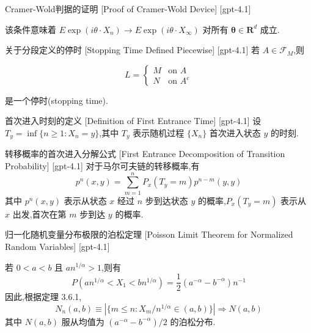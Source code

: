 \documentclass[UTF8]{ctexart}
\begin{document}
    
    
    \begin{prf}
        {Cramer-Wold判据的证明}
        [Proof of Cramer-Wold Device]
        [gpt-4.1]
        
该条件意味着 $E \exp(i \theta \cdot X_n) \to E \exp(i \theta \cdot X_\infty)$ 对所有 $\boldsymbol{\theta} \in \mathbf{R}^d$ 成立.

    \end{prf}
    
    
    
    \begin{thm}
        {关于分段定义的停时}
        [Stopping Time Defined Piecewise]
        [gpt-4.1]
        若 $A \in \mathcal{F}_{M}$,则

\[
L = \begin{cases}
M & \text{on } A \\
N & \text{on } A^{c}
\end{cases}
\]

是一个停时(stopping time).
    \end{thm}
    
    
    
    \begin{dfn}
        {首次进入时刻的定义}
        [Definition of First Entrance Time]
        [gpt-4.1]
        设 $T _ { y } = \operatorname*{inf} \{ n \geq 1 : X _ { n } = y \}$,其中 $T_y$ 表示随机过程 $\{X_n\}$ 首次进入状态 $y$ 的时刻.
    \end{dfn}
    
    
    
    \begin{thm}
        {转移概率的首次进入分解公式}
        [First Entrance Decomposition of Transition Probability]
        [gpt-4.1]
        对于马尔可夫链的转移概率,有
\[
p ^ { n } ( x , y ) = \sum _ { m = 1 } ^ { n } P _ { x } ( T _ { y } = m ) p ^ { n - m } ( y , y )
\]
其中 $p^n(x,y)$ 表示从状态 $x$ 经过 $n$ 步到达状态 $y$ 的概率,$P_x(T_y = m)$ 表示从 $x$ 出发,首次在第 $m$ 步到达 $y$ 的概率.
    \end{thm}
    
    
    
    \begin{thm}
        {归一化随机变量分布极限的泊松定理}
        [Poisson Limit Theorem for Normalized Random Variables]
        [gpt-4.1]
        
若 $0 < a < b$ 且 $a n^{1/\alpha} > 1$,则有
\[
P ( a n^{1/\alpha} < X_1 < b n^{1/\alpha} ) = \frac{1}{2} ( a^{-\alpha} - b^{-\alpha} ) n^{-1}
\]
因此,根据定理 3.6.1,
\[
N_n ( a, b ) \equiv | \{ m \leq n : X_m / n^{1/\alpha} \in ( a, b ) \} | \Rightarrow N ( a, b )
\]
其中 $N(a, b)$ 服从均值为 $( a^{-\alpha} - b^{-\alpha} ) / 2$ 的泊松分布.

    \end{thm}
    
\end{document}
